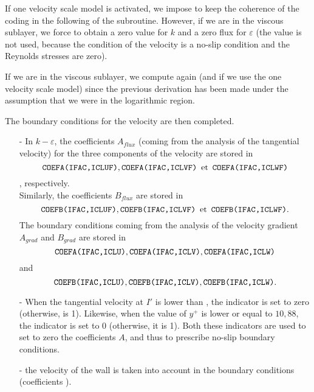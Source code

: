 If one velocity scale model is activated, we impose  to 
keep the coherence of the coding in the following of the subroutine. 
However, if we are in the viscous sublayer, we force   to 
obtain a zero value for $k$ and a zero flux for $\varepsilon$ 
(the value   is not used, because the condition of the velocity 
is a no-slip condition and the Reynolds stresses are zero).

If we are in the viscous sublayer, we compute   again (and
 if we use the one velocity scale model) since the previous
derivation has been made under the assumption that we were in the 
logarithmic region.


The boundary conditions for the velocity are then completed.
\begin{itemize}

\item [-] In $k-\varepsilon$, the coefficients $A_{flux}$ 
(coming from the analysis of the tangential velocity) for the three
components of the velocity are stored in 
 $$\text{\texttt{COEFA(IFAC,ICLUF)}}, \text{\texttt{COEFA(IFAC,ICLVF)}} \,\text{ et
}\,\text{\texttt{COEFA(IFAC,ICLWF)}}$$, respectively.\\ 
 Similarly, the coefficients $B_{flux}$ are stored in 
$$\text{\texttt{COEFB(IFAC,ICLUF)}}, \text{\texttt{COEFB(IFAC,ICLVF)}} \,\text{ et
}\,\text{\texttt{COEFB(IFAC,ICLWF)}}.$$ The boundary conditions 
coming from the analysis of the velocity gradient $A_{grad}$ and
$B_{grad}$ are stored in  $$\text{\texttt{COEFA(IFAC,ICLU)}},
\text{\texttt{COEFA(IFAC,ICLV)}}, \text{\texttt{COEFA(IFAC,ICLW)}}$$ and 
$$\text{\texttt{COEFB(IFAC,ICLU)}}, \text{\texttt{COEFB(IFAC,ICLV)}}, \text{\texttt{COEFB(IFAC,ICLW)}}.$$

\item [-] When the tangential velocity at $I'$ is lower than 
, the indicator  is set to zero (otherwise,  
 is 1).
Likewise,  when the value of
$y^+$ is lower or equal to $10,88$, the indicator
 is set to 0 (otherwise, it is 1). Both these indicators 
are used to set to zero the coefficients $A$, and thus to prescribe no-slip 
boundary conditions.

\item [-] the velocity of the wall is taken into account in the 
boundary conditions (coefficients ).

\end{itemize}

